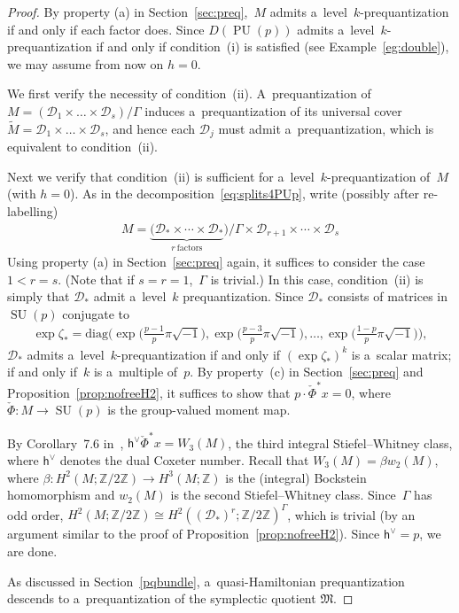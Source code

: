 \documentclass[11pt]{article}
\numberwithin{equation}{section}
\DeclareMathOperator{\SU}{SU}
\DeclareMathOperator{\PU}{PU}
\begin{document}
\begin{proof}
By property (a) in Section~\ref{sec:preq},~$M$ admits a~level~$k$-prequantization if and only if each factor does.
Since $D(\PU(p))$ admits a~level~$k$-prequantization if and only if condition~(i) %
is satisf\/ied (see Example~\ref{eg:double}), we may assume from now on $h=0$.

We f\/irst verify the necessity of condition~(ii). %
A~prequantization of $M=(\mathcal{D}_1 \times \dots \times \mathcal{D}_s) /\Gamma$ induces a~prequantization of its
universal cover $\tilde{M}=\mathcal{D}_1 \times \dots \times \mathcal{D}_s$, and hence each $\mathcal{D}_j$ must admit
a~prequantization, which is equivalent to condition~(ii). %

Next we verify that condition~(ii) %
is suf\/f\/icient for a~level~$k$-prequantization of~$M$ (with $h=0$).
As in the decomposition~\eqref{eq:splits4PUp}, write (possibly after re-labelling)
\begin{gather*}
M=\underbrace{(\mathcal{D}_* \times \cdots \times \mathcal{D}_*}_{r~\text{factors}})/\Gamma \times \mathcal{D}_{r+1}
\times \cdots \times \mathcal{D}_s
\end{gather*}
Using property (a) in Section~\ref{sec:preq} again, it suf\/f\/ices to consider the case $1<r=s$.
(Note that if $s=r=1$,~$\Gamma$ is trivial.) In this case, condition~(ii) %
is simply that $\mathcal{D}_*$ admit a~level~$k$ prequantization.
Since $\mathcal{D}_*$ consists of matrices in $\SU(p)$ conjugate to
\begin{gather*}
\exp \zeta_* = \mathrm{diag}\big(\exp\big(\tfrac{p-1}{p}\pi\sqrt{-1}\big), \exp\big(\tfrac{p-3}{p}\pi\sqrt{-1}\big), \dots,
\exp\big(\tfrac{1-p}{p}\pi\sqrt{-1}\big)\big),
\end{gather*}
$\mathcal{D}_*$ admits a~level~$k$-prequantization if and only if $(\exp \zeta_*)^k$ is a~scalar matrix; if and only
if~$k$ is a~multiple of~$p$.
By property~(c) in Section~\ref{sec:preq} and Proposition~\ref{prop:nofreeH2}, it suf\/f\/ices to show that
$p\cdot\check{\Phi}^*x =0$, where $\check{\Phi}:M\to \SU(p)$ is the group-valued moment map.

By Corollary~7.6 in~\cite{AM}, $\mathsf{h}^\vee \check{\Phi}^*x=W_3(M)$, the third integral Stiefel--Whitney class, where
$\mathsf{h}^\vee$ denotes the dual Coxeter number.
Recall that $W_3(M)=\beta w_2(M)$, where $\beta: H^2(M;{\mathbb{Z}}/2{\mathbb{Z}}) \to H^3(M;{\mathbb{Z}})$ is the
(integral) Bockstein homomorphism and $w_2(M)$ is the second Stiefel--Whitney class.
Since~$\Gamma$ has odd order, $H^2(M;{\mathbb{Z}}/2{\mathbb{Z}}) \cong
H^2((\mathcal{D}_*)^r;{\mathbb{Z}}/2{\mathbb{Z}})^\Gamma$, which is trivial (by an argument similar to the proof of
Proposition~\ref{prop:nofreeH2}).
Since $\mathsf{h}^\vee=p$, we are done.

As discussed in Section~\ref{pqbundle}, a~quasi-Hamiltonian prequantization descends to a~prequantization of the
symplectic quotient $\mathfrak{M}$.
\end{proof}
\end{document}
